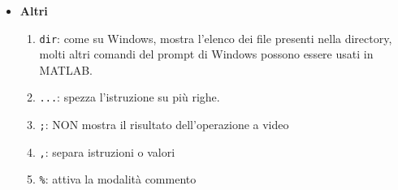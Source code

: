 \begin{itemize}
    \item   \textbf{Altri }  \\
            \begin{enumerate}
                \item \texttt{dir}: come su Windows, mostra l'elenco dei file presenti nella directory, molti altri 
                comandi del prompt di Windows possono essere usati in MATLAB.
                \item \texttt{...}: spezza l'istruzione su più righe.
                \item \texttt{;}: NON mostra il risultato dell'operazione a video
                \item \texttt{,}: separa istruzioni o valori
                \item \texttt{\%}: attiva la modalità commento
            \end{enumerate}
\end{itemize}